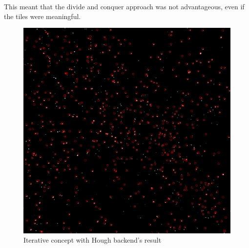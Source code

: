 This meant that the divide and conquer approach was not advantageous, even if the tiles were meaningful.

\begin{figure}
	\centerline{\includegraphics[width=\locateimgsize]{images/locate/iterative-Hough.png}}
	\caption{\centering Iterative concept with Hough backend's result}
	\label{fig:locate:...}
\end{figure}
